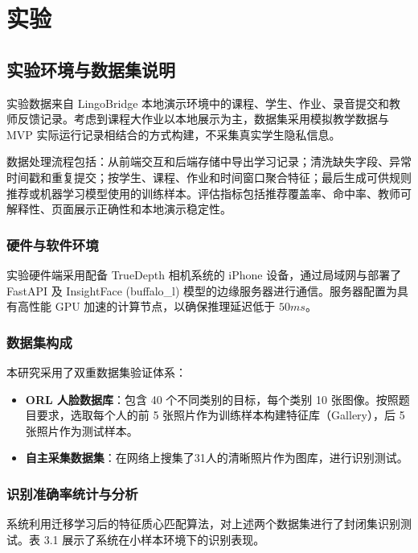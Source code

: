 \chapter{实验}

\section{实验环境与数据集说明}

实验数据来自 LingoBridge 本地演示环境中的课程、学生、作业、录音提交和教师反馈记录。考虑到课程大作业以本地展示为主，数据集采用模拟教学数据与 MVP 实际运行记录相结合的方式构建，不采集真实学生隐私信息。

数据处理流程包括：从前端交互和后端存储中导出学习记录；清洗缺失字段、异常时间戳和重复提交；按学生、课程、作业和时间窗口聚合特征；最后生成可供规则推荐或机器学习模型使用的训练样本。评估指标包括推荐覆盖率、命中率、教师可解释性、页面展示正确性和本地演示稳定性。

\subsection{硬件与软件环境}
实验硬件端采用配备 TrueDepth 相机系统的 iPhone 设备，通过局域网与部署了 FastAPI 及 InsightFace (buffalo\_l) 模型的边缘服务器进行通信。服务器配置为具有高性能 GPU 加速的计算节点，以确保推理延迟低于 $50ms$。

\subsection{数据集构成}
本研究采用了双重数据集验证体系：
\begin{itemize}
    \item \textbf{ORL 人脸数据库}：包含 40 个不同类别的目标，每个类别 10 张图像。按照题目要求，选取每个人的前 5 张照片作为训练样本构建特征库（Gallery），后 5 张照片作为测试样本。
    \item \textbf{自主采集数据集}：在网络上搜集了31人的清晰照片作为图库，进行识别测试。
\end{itemize}

\subsection{识别准确率统计与分析}

系统利用迁移学习后的特征质心匹配算法，对上述两个数据集进行了封闭集识别测试。表 3.1 展示了系统在小样本环境下的识别表现。

